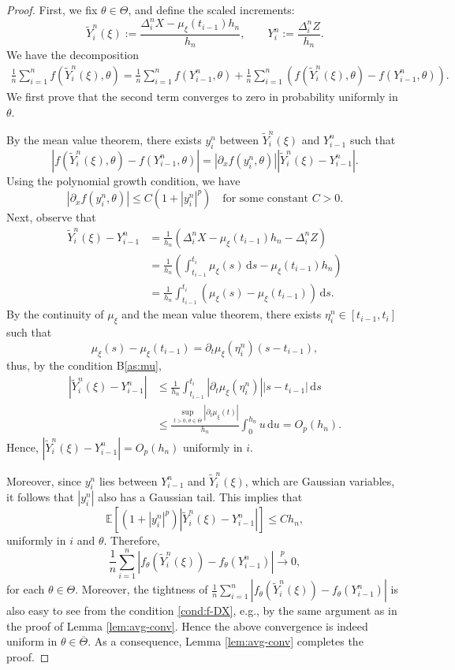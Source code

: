 \documentclass[a4paper,10pt,twoside]{article}
\numberwithin{equation}{section}
\def\l{\left}
\def\r{\right}
\def\th{\theta}
\def\toP{\stackrel{p}{\longrightarrow}}
\def\E{\mathbb{E}}
\def\ol#1{\overline{#1}}
\def\df{\mathrm{d}}
\begin{document}
\begin{proof}
First, we fix $\th\in \Theta$, and define the scaled increments:
\[
\widetilde{Y}_i^n(\xi) := \frac{\Delta_i^n X - \mu_\xi(t_{i-1})h_n }{h_n}, \qquad Y_i^n := \frac{\Delta_i^n Z}{h_n}.
\]
We have the decomposition
\begin{align*}
\frac{1}{n} \sum_{i=1}^n f(\widetilde{Y}_i^n(\xi),\th) = \frac{1}{n} \sum_{i=1}^n f(Y_{i-1}^n,\th) + \frac{1}{n} \sum_{i=1}^n \l( f(\widetilde{Y}_i^n(\xi),\th) - f(Y_{i-1}^n,\th) \r).
\end{align*}
We first prove that the second term converges to zero in probability uniformly in $\theta$.

By the mean value theorem, there exists $y_i^n$ between $\widetilde{Y}_i^n(\xi)$ and $Y_{i-1}^n$ such that
\[
|f(\widetilde{Y}_i^n(\xi),\theta) - f(Y_{i-1}^n,\theta)| = |\partial_x f(y_i^n,\theta)||\widetilde{Y}_i^n(\xi) - Y_{i-1}^n|. 
\]
Using the polynomial growth condition, we have
\[
|\partial_x f(y_i^n, \th)| \le C(1 + |y_i^n|^p) \quad \text{for some constant } C>0.
\]
Next, observe that
\begin{align*}
\widetilde{Y}_i^n(\xi) - Y_{i-1}^n &= \frac{1}{h_n} \l( \Delta_i^n X - \mu_\xi(t_{i-1}) h_n - \Delta_i^n Z \r) \\
&= \frac{1}{h_n} \l( \int_{t_{i-1}}^{t_i} \mu_\xi(s)\,\df s - \mu_\xi(t_{i-1}) h_n \r) \\
&= \frac{1}{h_n} \int_{t_{i-1}}^{t_i} (\mu_\xi(s) - \mu_\xi(t_{i-1}))\,\df s.
\end{align*}
By the continuity of $\mu_\xi$ and the mean value theorem, there exists $\eta_i^n \in [t_{i-1}, t_i]$ such that
\[
\mu_\xi(s) - \mu_\xi(t_{i-1}) = \partial_t \mu_\xi(\eta_i^n)(s - t_{i-1}),
\]
thus, by the condition B\ref{as:mu}, 
\begin{align*}
|\widetilde{Y}_i^n(\xi) - Y_{i-1}^n| &\le \frac{1}{h_n} \int_{t_{i-1}}^{t_i} |\partial_t \mu_\xi(\eta_i^n)||s - t_{i-1}|\,\df s \\
&\le \frac{\sup_{t>0,\th\in \ol{\Theta}}|\partial_t \mu_\xi(t)|}{h_n} \int_0^{h_n} u\,\df u  = O_p(h_n). 
\end{align*}
Hence, $|\widetilde{Y}_i^n(\xi) - Y_{i-1}^n| = O_p(h_n)$ uniformly in $i$.

Moreover, since $y_i^n$ lies between $Y_{i-1}^n$ and $\widetilde{Y}_i^n(\xi)$, which are Gaussian variables, it follows that $|y_i^n|$ also has a Gaussian tail. 
This implies that 
\[
\E\l[ (1 + |y_i^n|^p) |\widetilde{Y}_i^n(\xi) - Y_{i-1}^n| \r] \le C h_n, 
\]
uniformly in $i$ and $\theta$.
Therefore,
\[
\frac{1}{n} \sum_{i=1}^n |f_\theta(\widetilde{Y}_i^n(\xi)) - f_\theta(Y_{i-1}^n)| \toP 0, 
\]
for each $\th\in \Theta$. Moreover, the tightness of $\frac{1}{n} \sum_{i=1}^n |f_\theta(\widetilde{Y}_i^n(\xi)) - f_\theta(Y_{i-1}^n)| $ is also easy to see from the condition \eqref{cond:f-DX}, e.g., by the same argument as in the proof of Lemma \ref{lem:avg-conv}. 
Hence the above convergence is indeed uniform in $\theta \in \overline{\Theta}$. 
As a consequence, Lemma \ref{lem:avg-conv} completes the proof. 
\end{proof}
\end{document}
